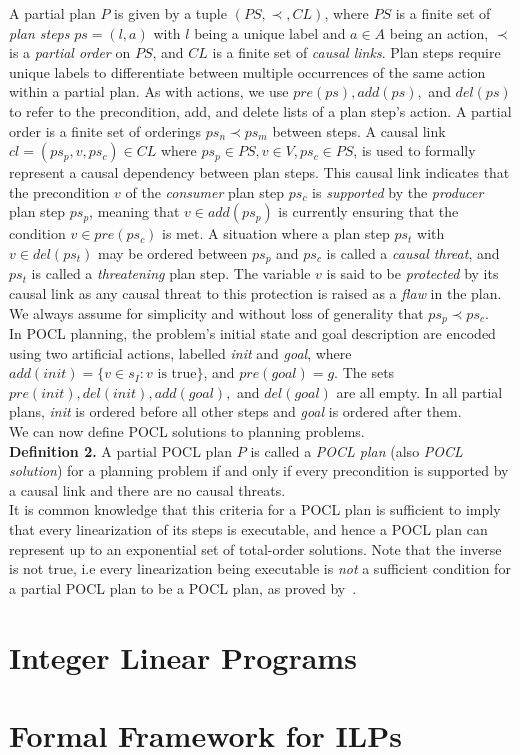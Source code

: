 A partial plan $P$ is given by a tuple $(PS,\prec , CL)$, where $PS$ is a finite set of \textit{plan steps} $ps=(l,a)$ with $l$ being a unique label and $a\in A$ being an action, $\prec$ is a \textit{partial order} on $PS$, and $CL$ is a finite set of \textit{causal links}. Plan steps require unique labels to differentiate between multiple occurrences of the same action within a partial plan. As with actions, we use $pre(ps),add(ps),$ and $del(ps)$ to refer to the precondition, add, and delete lists of a plan step's action. A partial order is a finite set of orderings $ps_n \prec ps_m$ between steps. A causal link $cl=(ps_p, v, ps_c)\in CL$ where $ps_p \in PS, v\in V, ps_c \in PS$, is used to formally represent a causal dependency between plan steps. This causal link indicates that the precondition $v$ of the \textit{consumer} plan step $ps_c$ is \textit{supported} by the \textit{producer} plan step $ps_p$, meaning that $v\in add(ps_p)$ is currently ensuring that the condition $v\in pre(ps_c)$ is met. A situation where a plan step $ps_t$ with $v\in del(ps_t)$ may be ordered between $ps_p$ and $ps_c$ is called a \textit{causal threat}, and $ps_t$ is called a \textit{threatening} plan step. The variable $v$ is said to be \textit{protected} by its causal link as any causal threat to this protection is raised as a \textit{flaw} in the plan. We always assume for simplicity and without loss of generality that $ps_p\prec ps_c$.\\


In POCL planning, the problem's initial state and goal description are encoded using two artificial actions, labelled \textit{init} and \textit{goal}, where $add(init)=\{v\in s_I: v \text{ is true}\}$, and $pre(goal)=g$. The sets $pre(init),del(init),add(goal),$ and $del(goal)$ are all empty. In all partial plans, \textit{init} is ordered before all other steps and \textit{goal} is ordered after them. \\


We can now define POCL solutions to planning problems.\\

\textbf{Definition 2.} A partial POCL plan $P$ is called a \textit{POCL plan} (also \textit{POCL solution}) for a planning problem if and only if every precondition is supported by a causal link and there are no causal threats.\\


It is common knowledge that this criteria for a POCL plan is sufficient to imply that every linearization of its steps is executable, and hence a POCL plan can represent up to an exponential set of total-order solutions. Note that the inverse is not true, i.e every linearization being executable is \textit{not} a sufficient condition for a partial POCL plan to be a POCL plan, as proved by~\cite{Bercher2020POPvsPOCL}.

\section{Integer Linear Programs}

\section{Formal Framework for ILPs}
